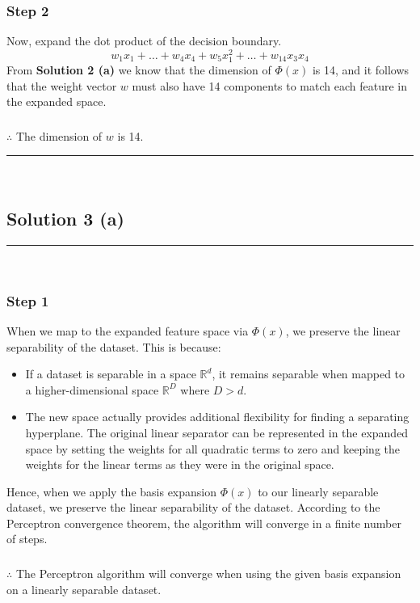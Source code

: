 \documentclass{article}
\begin{document}
\subsubsection*{Step 2}
\parbox{\textwidth}{
Now, expand the dot product of the decision boundary.
$$w_1 x_{1} + \ldots+ w_4 x_{4} + w_5 x_{1}^{2}+ \ldots + w_{14} x_{3} x_{4}$$
From \textbf{Solution 2 (a)} we know that the dimension of $\Phi(x)$ is 14, and  it follows that the weight vector $w$ must also have 14 components to match each feature in the expanded space.
}

\subsubsection*{\normalfont}{$\therefore$ The dimension of $w$ is 14.}

\noindent\rule{\textwidth}{0.4pt}\\

\newpage

\subsection*{Solution 3 (a)}
\noindent\rule{\textwidth}{0.4pt}\\

\subsubsection*{Step 1}
\parbox{\textwidth}{
When we map to the expanded feature space via $\Phi(x)$, we preserve the linear separability of the dataset. This is because:
\begin{itemize}
  \item If a dataset is separable in a space $\mathbb{R}^d$, it remains separable when mapped to a higher-dimensional space $\mathbb{R}^{D}$ where $D > d$.
  \item The new space actually provides additional flexibility for finding a separating hyperplane. The original linear separator can be represented in the expanded space by setting the weights for all quadratic terms to zero and keeping the weights for the linear terms as they were in the original space.
\end{itemize}
Hence, when we apply the basis expansion $\Phi(x)$ to our linearly separable dataset, we preserve the linear separability of the dataset. According to the Perceptron convergence theorem, the algorithm will converge in a finite number of steps.
}

\subsubsection*{\normalfont}{$\therefore$ The Perceptron algorithm will converge when using the given basis expansion on a linearly separable dataset.}
\end{document}
